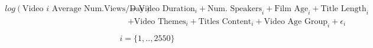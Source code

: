 \begin{align}
\begin{split}
log(\text{Video $i$ Average Num.Views/Day})&=\text{Video Duration}_i+\text{Num. Speakers}_i+\text{Film Age}_i+\text{Title Length}_i\\
&+\text{Video Themes}_i+\text{Titles Content}_i+\text{Video Age Group}_i+\epsilon_i\\
\end{split}
\label{poisson_simple_eqn}
\end{align}
\begin{equation*}
i=\{1,..,2550\}
\end{equation*}